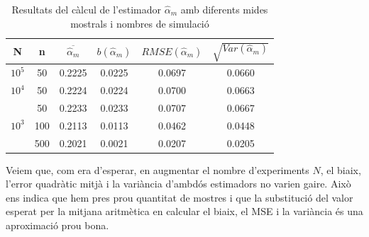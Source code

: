 \documentclass[12pt, catalan]{article}
\numberwithin{table}{section}
\numberwithin{figure}{section}
\numberwithin{equation}{section}
\begin{document}
\begin{table}[h]
\centering
\caption{Resultats del càlcul de l'estimador $\hat{\alpha}_m$ amb diferents mides mostrals i nombres de simulació}\vspace{0.3cm}
\begin{tabular}{|c|c|c|c|c|c|}
\hline
N                    & n   & $\overline{\hat{\alpha}_m}$    &$b(\hat{\alpha}_m)$& $RMSE(\hat{\alpha}_m)$ & $\sqrt{Var(\hat{\alpha}_m)}$ \\ \hline
$10^5$                  & 50  &  0.2225 &0.0225& 0.0697 & 0.0660 \\ \hline
$10^4$                   & 50  &  0.2224 &0.0224& 0.0700 & 0.0663 \\ \hline
\multirow{3}{*}{$10^3$ } & 50  &  0.2233 &0.0233& 0.0707 & 0.0667 \\ \cline{2-6} 
                     & 100 &  0.2113 &0.0113& 0.0462 & 0.0448 \\ \cline{2-6} 
                     & 500 &  0.2021 &0.0021& 0.0207 & 0.0205 \\ \hline
\end{tabular}
\label{globalalpha}
\end{table}

Veiem que, com era d'esperar, en augmentar el nombre d'experiments $N$, el biaix, l'error quadràtic mitjà i la variància d'ambdós estimadors no varien gaire. Això ens indica que hem pres prou quantitat de mostres i que la substitució del valor esperat per la mitjana aritmètica en calcular el biaix, el MSE i la variància és una aproximació prou bona. 
\end{document}
